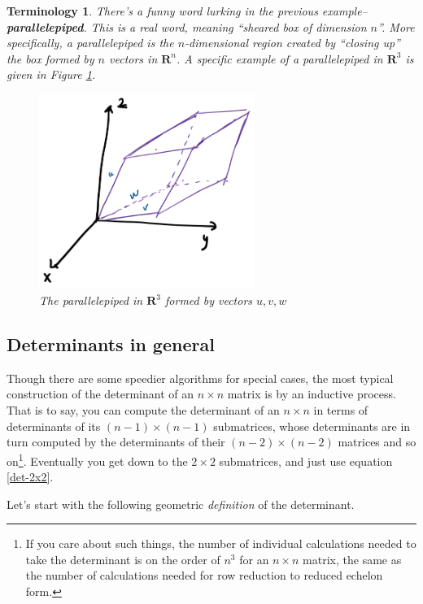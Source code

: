 \documentclass[12pt]{article}
\numberwithin{equation}{subsection}
\numberwithin{figure}{subsection}
\theoremstyle{note}
\newtheorem{terminology}[subsection]{Terminology}
\begin{document}
\begin{terminology}
There's a funny word lurking in the previous example--\textbf{parallelepiped}. This is a real word, meaning ``sheared box of dimension $n$''. More specifically, a parallelepiped is the $n$-dimensional region created by ``closing up'' the box formed by $n$ vectors in $\mathbf{R}^n$. A specific example of a parallelepiped in $\mathbf{R}^3$ is given in Figure \ref{fig-piped}.

\begin{figure}[h!]
\centering 
\includegraphics[width=70mm]{Images/img-piped}
\caption{The parallelepiped in $\mathbf{R}^3$ formed by vectors $u,v,w$}
\label{fig-piped}
\end{figure}

\end{terminology}

\subsection{Determinants in general}
Though there are some speedier algorithms for special cases, the most typical construction of the determinant of an $n\times n$ matrix is by an inductive process. That is to say, you can compute the determinant of an $n\times n$ in terms of determinants of its $(n-1)\times (n-1)$ submatrices, whose determinants are in turn computed by the determinants of their $(n-2)\times (n-2)$ matrices and so on\footnote{If you care about such things, the number of individual calculations needed to take the determinant is on the order of $n^3$ for an $n\times n$ matrix, the same as the number of calculations needed for row reduction to reduced echelon form.}. Eventually you get down to the $2\times 2$ submatrices, and just use equation \eqref{det-2x2}.

Let's start with the following geometric \textit{definition} of the determinant. 
\end{document}
